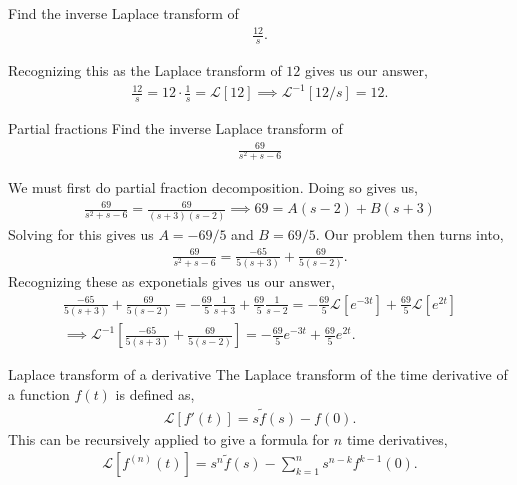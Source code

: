 \documentclass[11pt]{article}
\theoremstyle{mystyle}
\begin{document}
\begin{psexample}{}{}
        Find the inverse Laplace transform of
        \begin{align*}
            \frac{12}{s}.
        \end{align*}
    \end{psexample}
    \begin{pssolution}{}{}
        Recognizing this as the Laplace transform of
        $12$ gives us our answer,
        \begin{align*}
            \frac{12}{s} = 12 \cdot \frac{1}{s} = \mathcal{L}[12] \implies \mathcal{L}^{-1}[12/s] = 12.
        \end{align*}
    \end{pssolution}
    \begin{psexample}{Partial fractions}{}
        Find the inverse Laplace transform of
        \begin{align*}
            \frac{69}{s^2 + s - 6}
        \end{align*}
    \end{psexample}
    \begin{pssolution}{}{}
        We must first do partial fraction decomposition.
        Doing so gives us,
        \begin{align*}
            \frac{69}{s^2 + s - 6} = \frac{69}{(s + 3)(s - 2)} \implies 69 = A(s - 2) + B(s + 3)
        \end{align*}
        Solving for this gives us $A = -69/5$ and $B = 69/5$.
        Our problem then turns into,
        \begin{align*}
            \frac{69}{s^2 + s - 6} = \frac{-65}{5(s + 3)} + \frac{69}{5(s - 2)}.
        \end{align*}
        Recognizing these as exponetials gives us our answer,
        \begin{align*}
            \frac{-65}{5(s + 3)} + \frac{69}{5(s - 2)} = - \frac{69}{5} \frac{1}{s + 3} + \frac{69}{5} \frac{1}{s - 2} = - \frac{69}{5} \mathcal{L}[e^{-3t}] + \frac{69}{5} \mathcal{L}[e^{2t}]\\
            \implies
            \mathcal{L}^{-1}\left[ \frac{-65}{5(s + 3)} + \frac{69}{5(s - 2)} \right] = - \frac{69}{5} e^{-3t} + \frac{69}{5} e^{2t}.
        \end{align*}
    \end{pssolution}

\begin{psidea}{Laplace transform of a derivative}{}
    The Laplace transform of the time derivative
    of a function $f(t)$ is defined as,
    \begin{align*}
        \mathcal{L}[f'(t)] = s\tilde{f}(s) - f(0).
    \end{align*}
    This can be recursively applied to give a formula
    for $n$ time derivatives,
    \begin{align*}
        \mathcal{L}[f^{(n)}(t)] = s^n \tilde{f}(s) - \sum_{k = 1}^{n} s^{n - k} f^{k - 1}(0).
    \end{align*}
\end{psidea}
\end{document}
